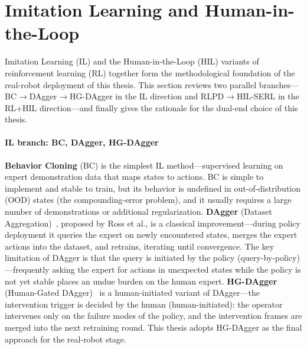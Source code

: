 \section{Imitation Learning and Human-in-the-Loop}\label{sec:il_hil}

Imitation Learning (IL) and the Human-in-the-Loop (HIL) variants of reinforcement learning (RL) together form the methodological foundation of the real-robot deployment of this thesis. This section reviews two parallel branches---BC$\to$DAgger$\to$HG-DAgger in the IL direction and RLPD$\to$HIL-SERL in the RL$+$HIL direction---and finally gives the rationale for the dual-end choice of this thesis.

\paragraph{IL branch: BC, DAgger, HG-DAgger} \textbf{Behavior Cloning} (BC) is the simplest IL method---supervised learning on expert demonstration data that maps states to actions. BC is simple to implement and stable to train, but its behavior is undefined in out-of-distribution (OOD) states (the compounding-error problem), and it usually requires a large number of demonstrations or additional regularization. \textbf{DAgger} (Dataset Aggregation)~\cite{ross2011dagger}, proposed by Ross et al., is a classical improvement---during policy deployment it queries the expert on newly encountered states, merges the expert actions into the dataset, and retrains, iterating until convergence. The key limitation of DAgger is that the query is initiated by the policy (query-by-policy)---frequently asking the expert for actions in unexpected states while the policy is not yet stable places an undue burden on the human expert. \textbf{HG-DAgger} (Human-Gated DAgger)~\cite{kelly2019hgdagger} is a human-initiated variant of DAgger---the intervention trigger is decided by the human (human-initiated): the operator intervenes only on the failure modes of the policy, and the intervention frames are merged into the next retraining round. This thesis adopts HG-DAgger as the final approach for the real-robot stage.

